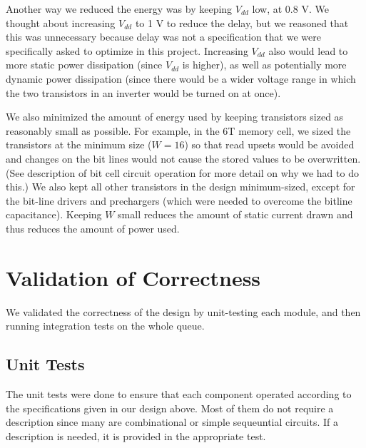 \documentclass[12pt]{report}
\begin{document}
Another way we reduced the energy was by keeping $V_{dd}$ low, at 0.8 V. We thought about increasing $V_{dd}$ to 1 V to reduce the delay, but we reasoned that this was unnecessary because delay was not a specification that we were specifically asked to optimize in this project. Increasing $V_{dd}$ also would lead to more static power dissipation (since $V_{dd}$ is higher), as well as potentially more dynamic power dissipation (since there would be a wider voltage range in which the two transistors in an inverter would be turned on at once).

We also minimized the amount of energy used by keeping transistors sized as reasonably small as possible. For example, in the 6T memory cell, we sized the transistors at the minimum size ($W = 16$) so that read upsets would be avoided and changes on the bit lines would not cause the stored values to be overwritten. (See description of bit cell circuit operation for more detail on why we had to do this.) We also kept all other transistors in the design minimum-sized, except for the bit-line drivers and prechargers (which were needed to overcome the bitline capacitance). Keeping $W$ small reduces the amount of static current drawn and thus reduces the amount of power used.

\newpage
\section*{Validation of Correctness}
We validated the correctness of the design by unit-testing each module, and then running integration tests on the whole queue.

\subsection*{Unit Tests}
The unit tests were done to ensure that each component operated according to the specifications given in our design above. Most of them do not require a description since many are combinational or simple sequeuntial circuits. If a description is needed, it is provided in the appropriate test.
\end{document}
